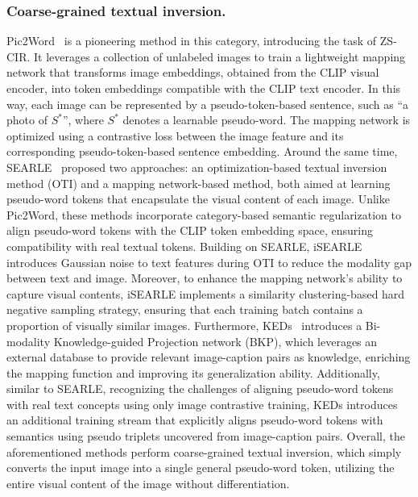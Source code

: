  \subsubsection{Coarse-grained textual inversion.}
 Pic2Word~\cite{pic2word} is a pioneering method in this category, introducing the task of ZS-CIR. It leverages a collection of unlabeled images to train a lightweight mapping network that transforms image embeddings, obtained from the CLIP visual encoder, into token embeddings compatible with the CLIP text encoder. In this way, each image can be represented by a pseudo-token-based sentence, such as ``a photo of $S^*$'', where $S^*$ denotes a learnable pseudo-word. The mapping network is optimized using a contrastive loss between the image feature and its corresponding pseudo-token-based sentence embedding.
 Around the same time, SEARLE~\cite{searle} proposed two approaches: an optimization-based textual inversion method (OTI) and a mapping network-based method, both aimed at learning pseudo-word tokens that encapsulate the visual content of each image. Unlike Pic2Word, these methods incorporate category-based semantic regularization to align pseudo-word tokens with the CLIP token embedding space, ensuring compatibility with real textual tokens.
 Building on SEARLE, iSEARLE~\cite{isearle} introduces Gaussian noise to text features during OTI to reduce the modality gap between text and image. Moreover, to enhance the mapping network's ability to capture visual contents, iSEARLE implements a similarity clustering-based hard negative sampling strategy, ensuring that each training batch contains a proportion of visually similar images.
 Furthermore, KEDs~\cite{keds} introduces a Bi-modality Knowledge-guided Projection network (BKP), which leverages an external database to provide relevant image-caption pairs as knowledge, enriching the mapping function and improving its generalization ability. Additionally, similar to SEARLE, recognizing the challenges of aligning pseudo-word tokens with real text concepts using only image contrastive training, KEDs introduces an additional training stream that explicitly aligns pseudo-word tokens with semantics using pseudo triplets uncovered from image-caption pairs. Overall, the aforementioned methods perform coarse-grained textual inversion, which simply converts the input image into a single general pseudo-word token, utilizing the entire visual content of the image without differentiation. 

